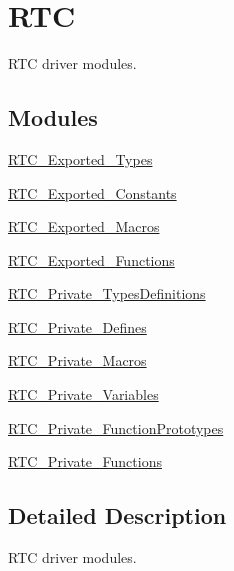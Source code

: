 \hypertarget{group___r_t_c}{}\section{R\+TC}
\label{group___r_t_c}


R\+TC driver modules.  


\subsection*{Modules}
\begin{DoxyCompactItemize}
\item 
\hyperlink{group___r_t_c___exported___types}{R\+T\+C\+\_\+\+Exported\+\_\+\+Types}
\item 
\hyperlink{group___r_t_c___exported___constants}{R\+T\+C\+\_\+\+Exported\+\_\+\+Constants}
\item 
\hyperlink{group___r_t_c___exported___macros}{R\+T\+C\+\_\+\+Exported\+\_\+\+Macros}
\item 
\hyperlink{group___r_t_c___exported___functions}{R\+T\+C\+\_\+\+Exported\+\_\+\+Functions}
\item 
\hyperlink{group___r_t_c___private___types_definitions}{R\+T\+C\+\_\+\+Private\+\_\+\+Types\+Definitions}
\item 
\hyperlink{group___r_t_c___private___defines}{R\+T\+C\+\_\+\+Private\+\_\+\+Defines}
\item 
\hyperlink{group___r_t_c___private___macros}{R\+T\+C\+\_\+\+Private\+\_\+\+Macros}
\item 
\hyperlink{group___r_t_c___private___variables}{R\+T\+C\+\_\+\+Private\+\_\+\+Variables}
\item 
\hyperlink{group___r_t_c___private___function_prototypes}{R\+T\+C\+\_\+\+Private\+\_\+\+Function\+Prototypes}
\item 
\hyperlink{group___r_t_c___private___functions}{R\+T\+C\+\_\+\+Private\+\_\+\+Functions}
\end{DoxyCompactItemize}


\subsection{Detailed Description}
R\+TC driver modules. 


